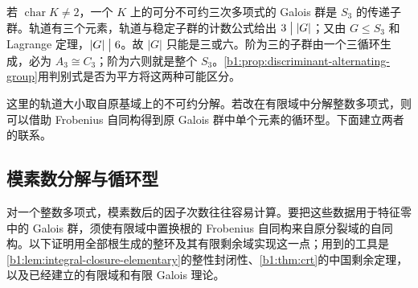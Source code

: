若 \(\operatorname{char}K\ne2\)，一个 \(K\) 上的可分不可约三次多项式的 Galois 群是 \(S_3\) 的传递子群。轨道有三个元素，轨道与稳定子群的计数公式给出 \(3\bigm\vert |G|\)；又由 \(G\le S_3\) 和 Lagrange 定理，\(|G|\bigm\vert 6\)。故 \(|G|\) 只能是三或六。阶为三的子群由一个三循环生成，必为 \(A_3\cong C_3\)；阶为六则就是整个 \(S_3\)。\cref{b1:prop:discriminant-alternating-group}用判别式是否为平方将这两种可能区分。

\ProseParagraphBreak
这里的轨道大小取自原基域上的不可约分解。若改在有限域中分解整数多项式，则可以借助 Frobenius 自同构得到原 Galois 群中单个元素的循环型。下面建立两者的联系。

\subsection{模素数分解与循环型}
\label{b1:subsec:1903:04}

对一个整数多项式，模素数后的因子次数往往容易计算。要把这些数据用于特征零中的 Galois 群，须使有限域中置换根的 Frobenius 自同构来自原分裂域的自同构。以下证明用全部根生成的整环及其有限剩余域实现这一点；用到的工具是\cref{b1:lem:integral-closure-elementary}的整性封闭性、\cref{b1:thm:crt}的中国剩余定理，以及已经建立的有限域和有限 Galois 理论。

